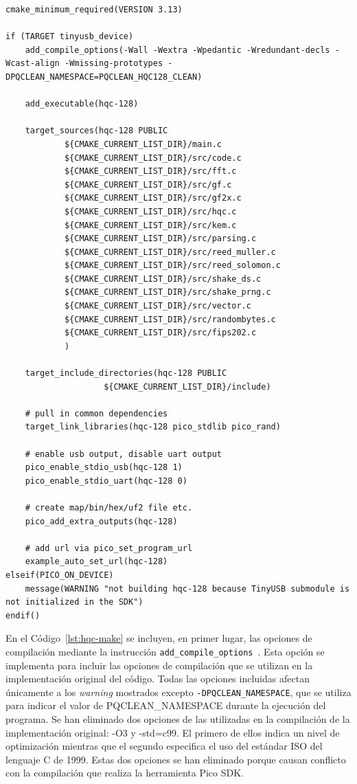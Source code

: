 \begin{lstlisting}[label={lst:hqc-make},style=Cnice,firstnumber=1,caption={Archivo \texttt{HQC-128/CMakeLists.txt}.}]
cmake_minimum_required(VERSION 3.13)

if (TARGET tinyusb_device)
    add_compile_options(-Wall -Wextra -Wpedantic -Wredundant-decls -Wcast-align -Wmissing-prototypes -DPQCLEAN_NAMESPACE=PQCLEAN_HQC128_CLEAN)

    add_executable(hqc-128)

    target_sources(hqc-128 PUBLIC
            ${CMAKE_CURRENT_LIST_DIR}/main.c
            ${CMAKE_CURRENT_LIST_DIR}/src/code.c
            ${CMAKE_CURRENT_LIST_DIR}/src/fft.c
            ${CMAKE_CURRENT_LIST_DIR}/src/gf.c
            ${CMAKE_CURRENT_LIST_DIR}/src/gf2x.c
            ${CMAKE_CURRENT_LIST_DIR}/src/hqc.c
            ${CMAKE_CURRENT_LIST_DIR}/src/kem.c
            ${CMAKE_CURRENT_LIST_DIR}/src/parsing.c
            ${CMAKE_CURRENT_LIST_DIR}/src/reed_muller.c
            ${CMAKE_CURRENT_LIST_DIR}/src/reed_solomon.c
            ${CMAKE_CURRENT_LIST_DIR}/src/shake_ds.c
            ${CMAKE_CURRENT_LIST_DIR}/src/shake_prng.c
            ${CMAKE_CURRENT_LIST_DIR}/src/vector.c
            ${CMAKE_CURRENT_LIST_DIR}/src/randombytes.c
            ${CMAKE_CURRENT_LIST_DIR}/src/fips202.c
            )
    
    target_include_directories(hqc-128 PUBLIC
                    ${CMAKE_CURRENT_LIST_DIR}/include)

    # pull in common dependencies
    target_link_libraries(hqc-128 pico_stdlib pico_rand)

    # enable usb output, disable uart output
    pico_enable_stdio_usb(hqc-128 1)
    pico_enable_stdio_uart(hqc-128 0)

    # create map/bin/hex/uf2 file etc.
    pico_add_extra_outputs(hqc-128)

    # add url via pico_set_program_url
    example_auto_set_url(hqc-128)
elseif(PICO_ON_DEVICE)
    message(WARNING "not building hqc-128 because TinyUSB submodule is not initialized in the SDK")
endif()
\end{lstlisting}

En el Código~\ref{lst:hqc-make} se incluyen, en primer lugar, las opciones de compilación mediante la instrucción \texttt{add\_compile\_options}~\cite{add-compile-options}.
Esta opción se implementa para incluir las opciones de compilación que se utilizan en la implementación original del código.
Todas las opciones incluidas afectan únicamente a los \textit{warning} mostrados excepto \texttt{-DPQCLEAN\_NAMESPACE}, que se utiliza para indicar el valor de PQCLEAN\_NAMESPACE durante la ejecución del programa.
Se han eliminado dos opciones de las utilizadas en la compilación de la implementación original: -O3 y -std=c99.
El primero de ellos indica un nivel de optimización mientras que el segundo especifica el uso del estándar ISO del lenguaje C de 1999.
Estas dos opciones se han eliminado porque causan conflicto con la compilación que realiza la herramienta Pico SDK.

